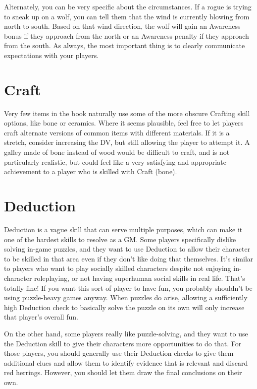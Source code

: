     Alternately, you can be very specific about the circumstances.
    If a rogue is trying to sneak up on a wolf, you can tell them that the wind is currently blowing from north to south.
    Based on that wind direction, the wolf will gain an Awareness bonus if they approach from the north or an Awareness penalty if they approach from the south.
    As always, the most important thing is to clearly communicate expectations with your players.

\section{Craft}

  Very few items in the book naturally use some of the more obscure Crafting skill options, like bone or ceramics.
  Where it seems plausible, feel free to let players craft alternate versions of common items with different materials.
  If it is a stretch, consider increasing the DV, but still allowing the player to attempt it.
  A galley made of bone instead of wood would be difficult to craft, and is not particularly realistic, but could feel like a very satisfying and appropriate achievement to a player who is skilled with Craft (bone).

\section{Deduction}

  Deduction is a vague skill that can serve multiple purposes, which can make it one of the hardest skills to resolve as a GM.
  Some players specifically dislike solving in-game puzzles, and they want to use Deduction to allow their character to be skilled in that area even if they don't like doing that themselves.
  It's similar to players who want to play socially skilled characters despite not enjoying in-character roleplaying, or not having superhuman social skills in real life.
  That's totally fine!
  If you want this sort of player to have fun, you probably shouldn't be using puzzle-heavy games anyway.
  When puzzles do arise, allowing a sufficiently high Deduction check to basically solve the puzzle on its own will only increase that player's overall fun.

  On the other hand, some players really like puzzle-solving, and they want to use the Deduction skill to give their characters more opportunities to do that.
  For those players, you should generally use their Deduction checks to give them additional clues and allow them to identify evidence that is relevant and discard red herrings.
  However, you should let them draw the final conclusions on their own.

